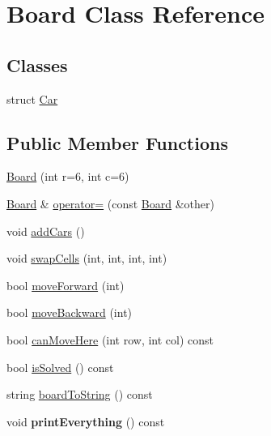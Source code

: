 \hypertarget{class_board}{\section{Board Class Reference}
\label{class_board}
}
\subsection*{Classes}
\begin{DoxyCompactItemize}
\item 
struct \hyperlink{struct_board_1_1_car}{Car}
\end{DoxyCompactItemize}
\subsection*{Public Member Functions}
\begin{DoxyCompactItemize}
\item 
\hyperlink{class_board_a9db987525359a83281f439e29de8a0ed}{Board} (int r=6, int c=6)
\item 
\hyperlink{class_board}{Board} \& \hyperlink{class_board_ae6c8d66af1bb70e1d34a704321675975}{operator=} (const \hyperlink{class_board}{Board} \&other)
\item 
void \hyperlink{class_board_ace31b86f9f51f587a6c2ba5a5d0985f0}{add\+Cars} ()
\item 
void \hyperlink{class_board_a920001868ffd3c2052e5d4e74f5c572d}{swap\+Cells} (int, int, int, int)
\item 
bool \hyperlink{class_board_a786078ebc74eb75daf35ee0544268f60}{move\+Forward} (int)
\item 
bool \hyperlink{class_board_ac7d514a5419f6769680e9cc69940cb43}{move\+Backward} (int)
\item 
bool \hyperlink{class_board_ad2a89f2b09377aeb8ca2e5227ca7e5a2}{can\+Move\+Here} (int row, int col) const 
\item 
bool \hyperlink{class_board_ac4ff60c93408bf056ee3af19138a6d96}{is\+Solved} () const 
\item 
string \hyperlink{class_board_abdfc2421a2c14024ea74924f09b6f777}{board\+To\+String} () const 
\item 
\hypertarget{class_board_ad9f8a4777501205f36488c5b4590ab7f}{void {\bfseries print\+Everything} () const }\label{class_board_ad9f8a4777501205f36488c5b4590ab7f}

\end{DoxyCompactItemize}
